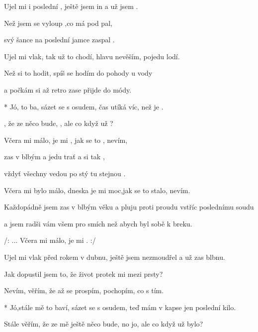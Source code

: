 

\zs
Ujel mi  i poslední , ještě jsem  in a už jsem . 

Než jsem se  vyloup ,co má  pod pal, 

 svý šance na poslední jamce zaspal . 
\ks

\zs
Ujel mi vlak, tak už to chodí, hlavu nevěším, pojedu lodí. 

Než si to hodit, spíš se hodím do pohody u vody 

a počkám si až retro zase přijde do módy. 
\ks

\zs
* Jó,   to ba, sázet se s osudem,  čas utíká víc, než je . 

 , že ze  něco bude, , ale co když už ? 
\ks

\zr
Včera mi  málo,  je mi , jak se to , nevím, 

  zas v blbým  a jedu  trať a  si tak , 

vždyť všechny  vedou  po stý  tu stejnou . 
\kr

\zr
Včera mi bylo málo, dneska je mi moc,jak se to stalo, nevím.

Každopádně jsem zas v blbým věku a pluju proti proudu vstříc poslednímu soudu 

a jsem radši vám všem pro smích než abych byl sobě k breku. 



/:   ... Včera mi  málo,  je mi . :/
\kr

\zs
Ujel mi vlak před rokem v dubnu, ještě jsem nezmoudřel a už zas blbnu. 

Jak dopustil jsem to, že život protek mi mezi prsty? 

Nevím, věřím, že až se prospím, pochopím, co s tím. 
\ks

\zs
* Jó,stále mě to baví, sázet se s osudem, teď mám v kapse jen poslední kilo. 

Stále věřím, že ze mě ještě něco bude, no jo, ale co když už bylo? 
\ks


